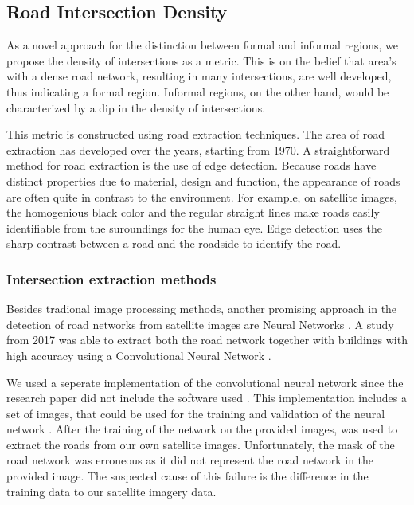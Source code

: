 \subsection{Road Intersection Density}

%

As a novel approach for the distinction between formal and informal regions, we
propose the density of intersections as a metric. This is on the belief that
area's with a dense road network, resulting in many intersections, are well
developed, thus indicating a formal region. Informal regions, on the other
hand, would be characterized by a dip in the density of intersections.  

This metric is constructed using road extraction techniques. The area of road
extraction has developed over the years, starting from 1970. A straightforward
method for road extraction is the use of edge detection. Because roads have
distinct properties due to material, design and function, the appearance of
roads are often quite in contrast to the environment. For example, on satellite
images, the homogenious black color and the regular straight lines make
roads easily identifiable from the suroundings for the human eye. Edge
detection uses the sharp contrast between a road and the roadside to identify
the road.


\subsubsection{Intersection extraction methods}

Besides tradional image processing methods, another promising approach in the
detection of road networks from satellite images are Neural Networks
\cite{mangala2011extraction} \cite{mokhtarzade2007road}. A study from 2017 was
able to extract both the road network together with buildings with high
accuracy using a Convolutional Neural Network \cite{alshehhi2017simultaneous}.

We used a seperate implementation of the convolutional neural network since the
research paper did not include the software used \cite{airs}. This
implementation includes a set of images, that could be used for the training
and validation of the neural network \cite{MnihThesis}. After the training of
the network on the provided images, was used to extract the roads from our own
satellite images.  Unfortunately, the mask of the road network was erroneous as
it did not represent the road network in the provided image. The suspected
cause of this failure is the difference in the training data to our satellite
imagery data.


